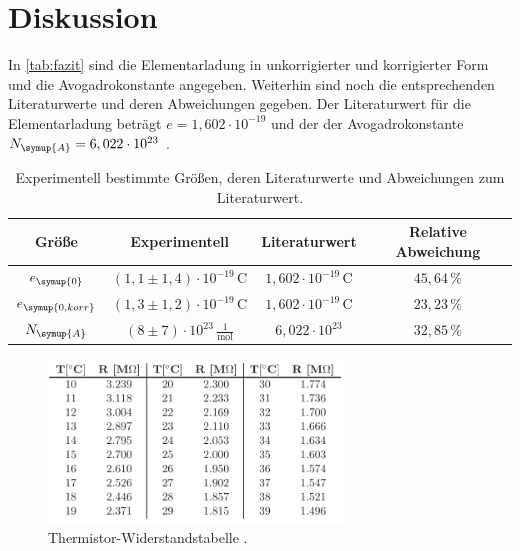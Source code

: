 \section{Diskussion}
\label{sec:Diskussion}
In \autoref{tab:fazit} sind die Elementarladung in unkorrigierter und korrigierter Form und die Avogadrokonstante
angegeben. Weiterhin sind noch die entsprechenden Literaturwerte und deren Abweichungen gegeben. Der Literaturwert
für die Elementarladung beträgt $e=1,602\cdot 10^{-19}$ \cite{e} und der der Avogadrokonstante $N_{\symup{A}}=
6,022\cdot 10^{23}$ \cite{avogadro}.

\begin{table}
    \centering
    \caption{Experimentell bestimmte Größen, deren Literaturwerte und Abweichungen zum Literaturwert.}
    \label{tab:fazit}
    \begin{tabular}{c | c c c}
        \toprule
        Größe & Experimentell & Literaturwert & Relative Abweichung \\
        \midrule
        $e_{\symup{0}}$         & $(1,1 \pm 1,4)\cdot 10^{-19}\,\si{\coulomb}$  & $1,602\cdot 10^{-19}\,\si{\coulomb}$  & $45,64\,\%$ \\
        $e_{\symup{0, korr}}$   & $(1,3 \pm 1,2)\cdot 10^{-19}\,\si{\coulomb}$  & $1,602\cdot 10^{-19}\,\si{\coulomb}$  & $23,23\,\%$ \\
        $N_{\symup{A}}$         & $(8 \pm 7)\cdot 10^{23}\,\frac{1}{\si{\mol}}$ & $6,022\cdot 10^{23}$                  & $32,85\,\%$ \\ 
        \bottomrule
    \end{tabular}
\end{table}

\label{sec:Anhang}

\begin{figure}
    \centering
    \includegraphics[width=0.7\textwidth]{bilder/thermistorwiderstand.png}
    \caption{Thermistor-Widerstandstabelle \cite{sample}.}
    \label{fig:thermistor}
\end{figure}

